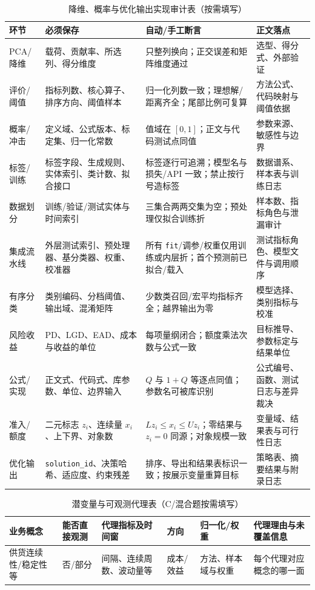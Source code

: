 \documentclass[withoutpreface,bwprint]{cumcmthesis}
\begin{document}
  \begin{table}[H]
    \centering
    \small
    \caption{降维、概率与优化输出实现审计表（按需填写）}
    \label{tab:implementation-lineage-guide}
    \begin{tabular}{p{1.8cm}p{3.4cm}p{4.1cm}p{3.5cm}}
      \toprule
      环节 & 必须保存 & 自动/手工断言 & 正文落点 \\
      \midrule
      PCA/降维 & 载荷、贡献率、所选列、得分维度 & 只整列换向；正交误差和矩阵维度通过 & 选型、得分式、外部验证 \\
      评价/阈值 & 指标列数、核心算子、排序方向、阈值样本 & 归一化列数一致；理想解/距离齐全；尾部比例可复算 & 方法公式、代码映射与阈值依据 \\
      概率/冲击 & 定义域、公式版本、标定集、归一化常数 & 值域在 $[0,1]$；正文与代码测试点同值 & 参数来源、敏感性与边界 \\
      标签/训练 & 标签字段、生成规则、实体索引、类计数、拟合接口 & 标签逐行可追溯；模型名与损失/API 一致；禁止按行号造标签 & 数据谱系、样本表与训练日志 \\
      数据划分 & 训练/验证/测试实体与时间索引 & 三集合两两交集为空；预处理仅拟合训练折 & 样本数、指标角色与泄漏审计 \\
      集成流水线 & 外层测试索引、预处理器、基分类器、权重、校准器 & 所有 \texttt{fit}/调参/权重仅用训练或内层折；首个预测前已拟合/载入 & 测试指标角色、模型文件与调用顺序 \\
      有序分类 & 类别编码、分档阈值、输出域、混淆矩阵 & 少数类召回/宏平均指标齐全；越界输出为零 & 模型选择、类别指标与校准 \\
      风险收益 & PD、LGD、EAD、成本与收益的单位 & 每项量纲闭合；额度乘法次数与公式一致 & 目标推导、参数标定与结果单位 \\
      公式/实现 & 正文式、代码式、库参数、单位、边界输入 & $Q$ 与 $1+Q$ 等逐点同值；参数名可被库识别 & 公式编号、函数、测试日志与差异裁决 \\
      准入/额度 & 二元标志 $z_i$、连续量 $x_i$、上下界、对象数 & $Lz_i\le x_i\le Uz_i$；零结果与 $z_i=0$ 同源；对象规模一致 & 变量域、结果表与可行性日志 \\
      优化输出 & \texttt{solution\_id}、决策哈希、适应度、约束残差 & 排序、导出和结果表标识一致；按展示变量重算目标 & 策略表、摘要结果与附录日志 \\
      \bottomrule
    \end{tabular}
  \end{table}
  \begin{table}[H]
    \centering
    \small
    \caption{潜变量与可观测代理表（C/混合题按需填写）}
    \label{tab:latent-proxy-guide}
    \begin{tabular}{p{2.0cm}p{1.65cm}p{2.65cm}p{1.25cm}p{2.35cm}p{3.0cm}}
      \toprule
      业务概念 & 能否直接观测 & 代理指标及时间窗 & 方向 & 归一化/权重 & 代理理由与未覆盖信息 \\
      \midrule
      供货连续性/稳定性等 & 否/部分 & 间隔、连续周数、波动量等 & 成本/效益 & 方法、样本域与权重 & 每个代理对应概念的哪一面 \\
      \bottomrule
    \end{tabular}
  \end{table}
\end{document}
